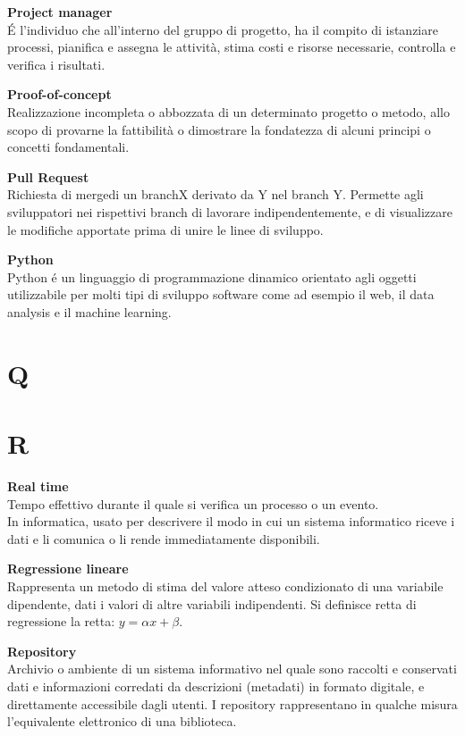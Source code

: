 \documentclass[a4paper, oneside, openany, dvipsnames, table, 12pt]{article}
\begin{document}
\textbf{Project manager} \\
\'E l'individuo che all'interno del gruppo di progetto, ha il compito di istanziare processi, pianifica e assegna le attività, stima costi e risorse necessarie, controlla e verifica i risultati.

\textbf{Proof-of-concept} \\
Realizzazione incompleta o abbozzata di un determinato progetto o metodo, allo scopo di provarne la fattibilità o dimostrare la fondatezza di alcuni principi o concetti fondamentali.

\textbf{Pull Request} \\
Richiesta di merge\glo di un branch\glo X derivato da Y nel branch Y. Permette agli sviluppatori nei rispettivi branch di lavorare indipendentemente, e di visualizzare le modifiche apportate prima di unire le linee di sviluppo.

\textbf{Python} \\
Python \'e un linguaggio di programmazione dinamico orientato agli oggetti utilizzabile per molti tipi di sviluppo software come ad esempio il web, il data analysis e il machine learning.

\newpage
\section{Q}

\newpage
\section{R}
\textbf{Real time} \\
Tempo effettivo durante il quale si verifica un processo o un evento. \\
In informatica, usato per descrivere il modo in cui un sistema informatico riceve i dati e li comunica o li rende immediatamente disponibili.

\textbf{Regressione lineare} \\
Rappresenta un metodo di stima del valore atteso condizionato di una variabile dipendente, dati i valori di altre variabili indipendenti. Si definisce retta di regressione la retta: $y = \alpha x + \beta $.

\textbf{Repository} \\
Archivio o ambiente di un sistema informativo nel quale sono raccolti e conservati dati e informazioni corredati da descrizioni (metadati) in formato digitale, e direttamente accessibile dagli utenti. I repository
rappresentano in qualche misura l’equivalente elettronico di una biblioteca.
\end{document}
